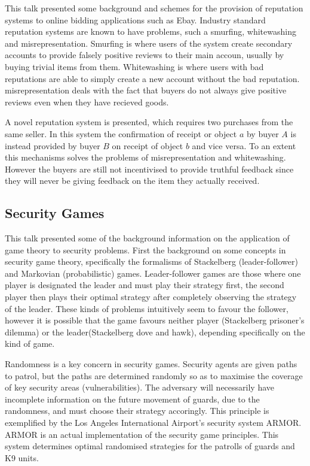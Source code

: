 \documentclass{article}
\begin{document}
This talk presented some background and schemes for the provision of reputation systems to online bidding applications such as Ebay.
Industry standard reputation systems are known to have problems, such a smurfing, whitewashing and misrepresentation.
Smurfing is where users of the system create secondary accounts to provide falsely positive reviews to their main accoun, usually by buying trivial items from them.
Whitewashing is where users with bad reputations are able to simply create a new account without the bad reputation.
misrepresentation deals with the fact that buyers do not always give positive reviews even when they have recieved goods.

A novel reputation system is presented, which requires two purchases from the same seller.
In this system the confirmation of receipt or object $a$ by buyer $A$ is instead provided by buyer $B$ on receipt of object $b$ and vice versa.
To an extent this mechanisms solves the problems of misrepresentation and whitewashing.
However the buyers are still not incentivised to provide truthful feedback since they will never be giving feedback on the item they actually received.

\subsection{Security Games}

This talk presented some of the background information on the application of game theory to security problems.
First the background on some concepts in security game theory, specifically the formalisms of Stackelberg (leader-follower) and Markovian (probabilistic) games.
Leader-follower games are those where one player is designated the leader and must play their strategy first, the second player then plays their optimal strategy after completely observing the strategy of the leader.
These kinds of problems intuitively seem to favour the follower, however it is possible that the game favours neither player (Stackelberg prisoner's dilemma) or the leader(Stackelberg dove and hawk), depending specifically on the kind of game.

Randomness is a key concern in security games.
Security agents are given paths to patrol, but the paths are determined randomly so as to maximise the coverage of key security areas (vulnerabilities).
The adversary will necessarily have incomplete information on the future movement of guards, due to the randomness, and must choose their strategy accoringly.
This principle is exemplified by the Los Angeles International Airport's security system ARMOR.
ARMOR is an actual implementation of the security game principles.
This system determines optimal randomised strategies for the patrolls of guards and K9 units.
\end{document}
